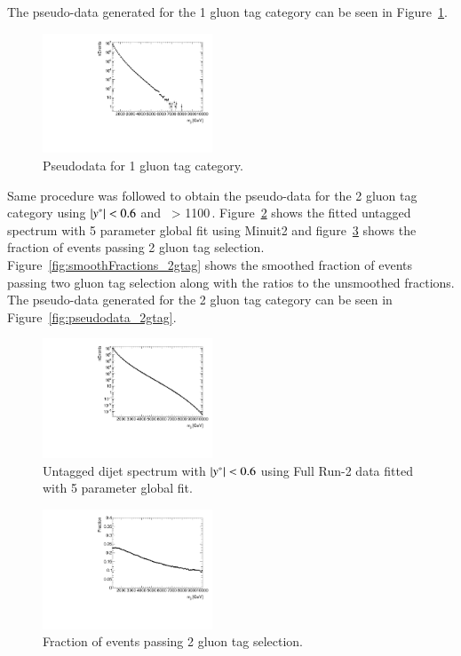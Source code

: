 The pseudo-data generated for the 1 gluon tag category can be seen in Figure~\ref{fig:pseudodata_1gtag}.

 \begin{figure}[!htb]
   \centering
   \includegraphics[width=0.45\textwidth]{figures/pseudodata/Pseudodata_1gluonTag.pdf}
   \caption{Pseudodata for 1 gluon tag category.
   \label{fig:pseudodata_1gtag}}
 \end{figure}

Same procedure was followed to obtain the pseudo-data for the 2 gluon tag category using $|y^\ast|<0.6$ and \mjj\ > 1100\,\GeV. 
Figure~\ref{fig:mjjFit_ystar0p6} shows the fitted untagged spectrum with 5 parameter global fit using Minuit2 and figure~\ref{fig:fraction_2gtag_unsmooth} shows the fraction of events passing 2 gluon tag selection.
Figure~\ref{fig:smoothFractions_2gtag} shows the smoothed fraction of events passing two gluon tag selection along with the ratios to the unsmoothed fractions. The pseudo-data 
generated for the 2 gluon tag category can be seen in Figure~\ref{fig:pseudodata_2gtag}.

 \begin{figure}[!htb]
   \centering
   \includegraphics[width=0.45\textwidth]{figures/pseudodata/FittedMjj_UntaggedData_yStar0p6}
   \caption{Untagged dijet spectrum with $|y^\ast|<0.6$ using Full Run-2 data fitted with 5 parameter global fit.
   \label{fig:mjjFit_ystar0p6}}
 \end{figure}

 \begin{figure}[!htb]
   \centering
   \includegraphics[width=0.45\textwidth]{figures/pseudodata/FractionUnsmooth_2gtag_yStar0p6}
   \caption{Fraction of events passing 2 gluon tag selection.
   \label{fig:fraction_2gtag_unsmooth}}
 \end{figure}


